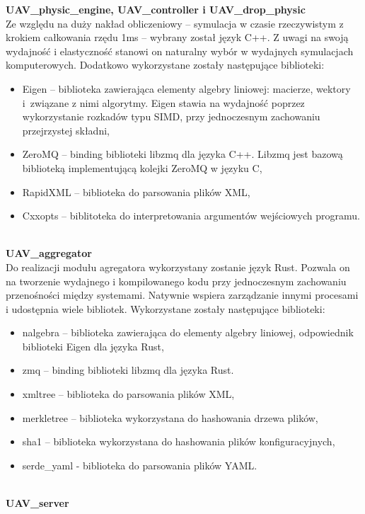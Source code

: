 \documentclass[15pt]{sprawozdanie}
\begin{document}
\textbf{UAV\_physic\_engine, UAV\_controller i UAV\_drop\_physic}\\

Ze względu na duży nakład obliczeniowy -- symulacja w czasie rzeczywistym z krokiem całkowania rzędu 1ms -- wybrany został język C++. Z uwagi na swoją wydajność i elastyczność stanowi on naturalny wybór w wydajnych symulacjach komputerowych. Dodatkowo wykorzystane zostały następujące biblioteki:
\begin{itemize}[noitemsep,nolistsep]
	\item Eigen -- biblioteka zawierająca elementy algebry liniowej: macierze, wektory i~związane z nimi algorytmy. Eigen stawia na wydajność poprzez wykorzystanie rozkadów typu SIMD, przy 		jednoczesnym zachowaniu przejrzystej składni,
	\item ZeroMQ -- binding biblioteki libzmq dla języka C++. Libzmq jest bazową biblioteką implementującą kolejki ZeroMQ w języku C,
	\item RapidXML -- biblioteka do parsowania plików XML,
	\item Cxxopts -- biblitoteka do interpretowania argumentów wejściowych programu.
\end{itemize}
\  \\
\textbf{UAV\_aggregator}\\

Do realizacji modułu agregatora wykorzystany zostanie język Rust. Pozwala on na tworzenie wydajnego i kompilowanego kodu przy jednoczesnym zachowaniu przenośności między systemami. Natywnie wspiera zarządzanie innymi procesami i udostępnia wiele bibliotek. Wykorzystane zostały następujące biblioteki:
\begin{itemize}[noitemsep,nolistsep]
	\item nalgebra -- biblioteka zawierająca do elementy algebry liniowej, odpowiednik biblioteki Eigen dla języka Rust,
	\item zmq -- binding biblioteki libzmq dla języka Rust.
	\item xmltree -- biblioteka do parsowania plików XML,
	\item merkletree -- biblioteka wykorzystana do hashowania drzewa plików,
	\item sha1 -- biblioteka wykorzystana do hashowania plików konfiguracyjnych,
	\item serde\_yaml  - biblioteka do parsowania plików YAML.
\end{itemize}
\  \\
\textbf{UAV\_server}\\
\end{document}
